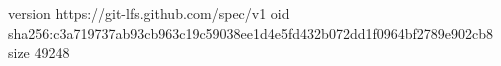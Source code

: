version https://git-lfs.github.com/spec/v1
oid sha256:c3a719737ab93cb963c19c59038ee1d4e5fd432b072dd1f0964bf2789e902cb8
size 49248

